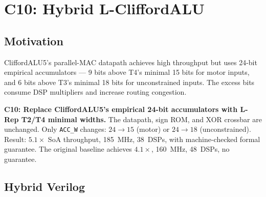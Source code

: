 \documentclass[11pt,a4paper]{article}
\theoremstyle{definition}
\theoremstyle{plain}
\theoremstyle{remark}
\begin{document}
\section{C10: Hybrid L-CliffordALU}
\label{sec:hybrid}

\subsection{Motivation}

CliffordALU5's parallel-MAC datapath achieves high throughput but uses
24-bit empirical accumulators --- 9 bits above T4's minimal 15 bits for
motor inputs, and 6 bits above T3's minimal 18 bits for unconstrained inputs.
The excess bits consume DSP multipliers and increase routing congestion.

\begin{insightbox}
\textbf{C10: Replace CliffordALU5's empirical 24-bit accumulators with
L-Rep T2/T4 minimal widths.}
The datapath, sign ROM, and XOR crossbar are unchanged.
Only \texttt{ACC\_W} changes: $24\to15$ (motor) or $24\to18$ (unconstrained).
Result: $5.1\times$ SoA throughput, 185~MHz, 38~DSPs, with machine-checked
formal guarantee.
The original baseline achieves $4.1\times$, 160~MHz, 48~DSPs, no guarantee.
\end{insightbox}

\subsection{Hybrid Verilog}
\end{document}
